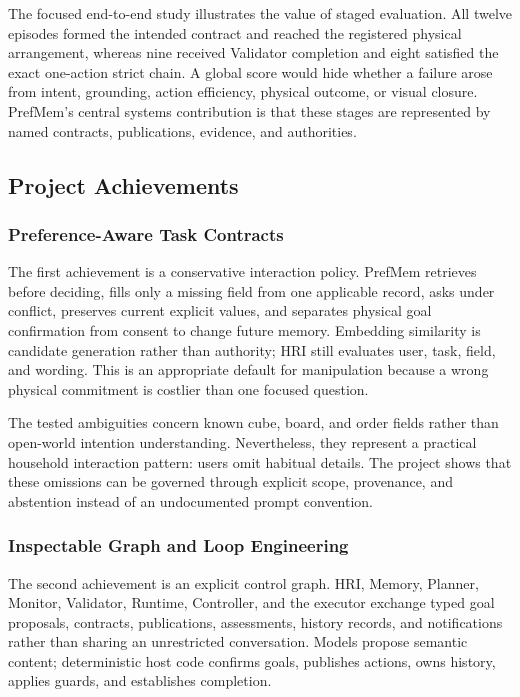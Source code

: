\documentclass{article}
\begin{document}
The focused end-to-end study illustrates the value of staged evaluation. All
twelve episodes formed the intended contract and reached the registered
physical arrangement, whereas nine received Validator completion and eight
satisfied the exact one-action strict chain. A global score would hide whether
a failure arose from intent, grounding, action efficiency, physical outcome, or
visual closure. PrefMem's central systems contribution is that these stages are
represented by named contracts, publications, evidence, and authorities.

\subsection{Project Achievements}
\label{subsec:discussion-achievements}

\subsubsection{Preference-Aware Task Contracts}

The first achievement is a conservative interaction policy. PrefMem retrieves
before deciding, fills only a missing field from one applicable record, asks
under conflict, preserves current explicit values, and separates physical goal
confirmation from consent to change future memory. Embedding similarity is
candidate generation rather than authority; HRI still evaluates user, task,
field, and wording. This is an appropriate default for manipulation because a
wrong physical commitment is costlier than one focused question.

The tested ambiguities concern known cube, board, and order fields rather than
open-world intention understanding. Nevertheless, they represent a practical
household interaction pattern: users omit habitual details. The project shows
that these omissions can be governed through explicit scope, provenance, and
abstention instead of an undocumented prompt convention.

\subsubsection{Inspectable Graph and Loop Engineering}

The second achievement is an explicit control graph. HRI, Memory, Planner,
Monitor, Validator, Runtime, Controller, and the executor exchange typed goal
proposals, contracts, publications, assessments, history records, and
notifications rather than sharing an unrestricted conversation. Models propose
semantic content; deterministic host code confirms goals, publishes actions,
owns history, applies guards, and establishes completion.
\end{document}
